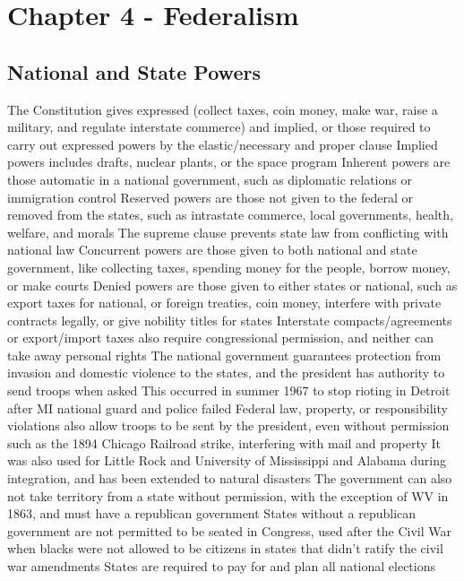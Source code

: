 \documentclass[11 pt, twoside]{article}
\newenvironment{outline*}
{
	\begin{outline}[enumerate]
	}
	{\end{outline}
}
\begin{document}
\section{Chapter 4 - Federalism}
\subsection{National and State Powers}
\begin{outline*}
\1 The Constitution gives expressed (collect taxes, coin money, make war, raise a military, and regulate interstate commerce) and implied, or those required to carry out expressed powers by the elastic/necessary and proper clause
\2 Implied powers includes drafts, nuclear plants, or the space program
\2 Inherent powers are those automatic in a national government, such as diplomatic relations or immigration control
\1 Reserved powers are those not given to the federal or removed from the states, such as intrastate commerce, local governments, health, welfare, and morals
\2 The supreme clause prevents state law from conflicting with national law
\1 Concurrent powers are those given to both national and state government, like collecting taxes, spending money for the people, borrow money, or make courts
\1 Denied powers are those given to either states or national, such as export taxes for national, or foreign treaties, coin money, interfere with private contracts legally, or give nobility titles for states
\2 Interstate compacts/agreements or export/import taxes also require congressional permission, and neither can take away personal rights
\1 The national government guarantees protection from invasion and domestic violence to the states, and the president has authority to send troops when asked
\2 This occurred in summer 1967 to stop rioting in Detroit after MI national guard and police failed
\2 Federal law, property, or responsibility violations also allow troops to be sent by the president, even without permission such as the 1894 Chicago Railroad strike, interfering with mail and property
\2 It was also used for Little Rock and University of Mississippi and Alabama during integration, and has been extended to natural disasters
\1 The government can also not take territory from a state without permission, with the exception of WV in 1863, and must have a republican government
\2 States without a republican government are not permitted to be seated in Congress, used after the Civil War when blacks were not allowed to be citizens in states that didn’t ratify the civil war amendments
\2 States are required to pay for and plan all national elections

\end{outline*}
\end{document}
